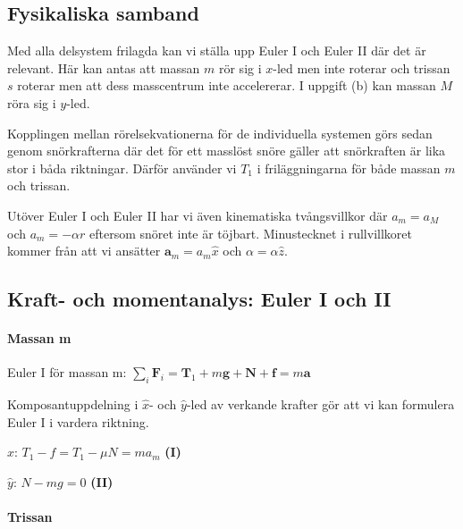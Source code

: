 \documentclass[11pt]{article}
\begin{document}
    \hypertarget{fysikaliska-samband}{%
\subsection{Fysikaliska samband}\label{fysikaliska-samband}}

Med alla delsystem frilagda kan vi ställa upp Euler I och Euler II där
det är relevant. Här kan antas att massan \(m\) rör sig i \(x\)-led men
inte roterar och trissan \(s\) roterar men att dess masscentrum inte
accelererar. I uppgift (b) kan massan \(M\) röra sig i \(y\)-led.

Kopplingen mellan rörelsekvationerna för de individuella systemen görs
sedan genom snörkrafterna där det för ett masslöst snöre gäller att
snörkraften är lika stor i båda riktningar. Därför använder vi \(T_1\) i
friläggningarna för både massan \(m\) och trissan.

Utöver Euler I och Euler II har vi även kinematiska tvångsvillkor där
\(a_m=a_M\) och \(a_m=-\alpha r\) eftersom snöret inte är töjbart.
Minustecknet i rullvillkoret kommer från att vi ansätter
\(\mathbf{a}_m=a_m\hat{x}\) och \(\alpha=\alpha\hat{z}\).

    \hypertarget{kraft--och-momentanalys-euler-i-och-ii}{%
\subsection{Kraft- och momentanalys: Euler I och
II}\label{kraft--och-momentanalys-euler-i-och-ii}}

\hypertarget{massan-m}{%
\paragraph{Massan m}\label{massan-m}}

Euler I för massan m:
\(\sum_i \mathbf{F}_i = \mathbf{T}_1 + m\mathbf{g} + \mathbf{N} + \mathbf{f} = m\mathbf{a}\)

Komposantuppdelning i \(\hat{x}\)- och \(\hat{y}\)-led av verkande
krafter gör att vi kan formulera Euler I i vardera riktning.

\(\hat{x}\): \(T_1-f= T_1-\mu N= ma_m\) \textbf{(I)}

\(\hat{y}\): \(N - mg = 0\) \textbf{(II)}

\hypertarget{trissan}{%
\paragraph{Trissan}\label{trissan}}
\end{document}
